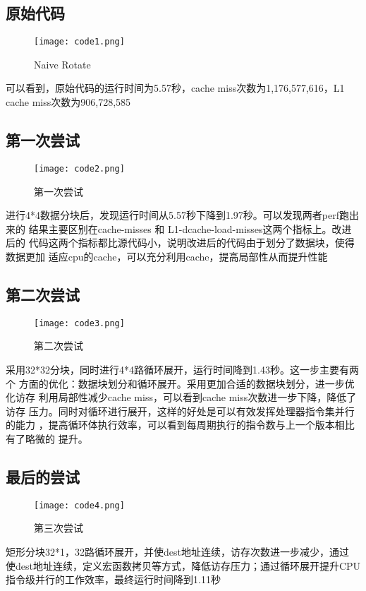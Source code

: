 \documentclass{article}
\begin{document}
\subsection{原始代码}
\begin{figure}[htpb]
    \centering
    \texttt{[image: code1.png]}    
    \caption{Naive Rotate}
\end{figure}
可以看到，原始代码的运行时间为5.57秒，cache miss次数为1,176,577,616，L1 cache miss次数为906,728,585

\subsection{第一次尝试}
\begin{figure}[htpb]
    \centering
    \texttt{[image: code2.png]}
    \caption{第一次尝试}
\end{figure}
进行4*4数据分块后，发现运行时间从5.57秒下降到1.97秒。可以发现两者perf跑出来的
结果主要区别在cache-misses 和 L1-dcache-load-misses这两个指标上。改进后的
代码这两个指标都比源代码小，说明改进后的代码由于划分了数据块，使得数据更加
适应cpu的cache，可以充分利用cache，提高局部性从而提升性能

\subsection{第二次尝试}
\begin{figure}[htpb]
    \centering
    \texttt{[image: code3.png]} 
    \caption{第二次尝试}
\end{figure}
采用32*32分块，同时进行4*4路循环展开，运行时间降到1.43秒。这一步主要有两个
方面的优化：数据块划分和循环展开。采用更加合适的数据块划分，进一步优化访存
利用局部性减少cache miss，可以看到cache miss次数进一步下降，降低了访存
压力。同时对循环进行展开，这样的好处是可以有效发挥处理器指令集并行的能力
，提高循环体执行效率，可以看到每周期执行的指令数与上一个版本相比有了略微的
提升。

\subsection{最后的尝试}
\begin{figure}[htpb]
    \centering
    \texttt{[image: code4.png]} 
    \caption{第三次尝试}
\end{figure}
矩形分块32*1，32路循环展开，并使dest地址连续，访存次数进一步减少，通过
使dest地址连续，定义宏函数拷贝等方式，降低访存压力；通过循环展开提升CPU
指令级并行的工作效率，最终运行时间降到1.11秒
\end{document}
